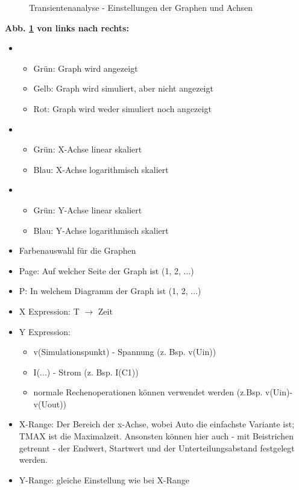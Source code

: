 \begin{figure}[h]
    \centering
    \caption{Transientenanalyse - Einstellungen der Graphen und Achsen}
    \label{fig:Transientenanalyse - Einstellungen der Graphen und Achsen}
\end{figure}

\textbf{Abb. \ref{fig:Transientenanalyse - Einstellungen der Graphen und Achsen} von links nach rechts:}
\begin{itemize}
    \item \begin{itemize}
        \item Grün: Graph wird angezeigt
        \item Gelb: Graph wird simuliert, aber nicht angezeigt
        \item Rot: Graph wird weder simuliert noch angezeigt
    \end{itemize}
    \item \begin{itemize}
        \item Grün: X-Achse linear skaliert
        \item Blau: X-Achse logarithmisch skaliert
    \end{itemize}
    \item \begin{itemize}
        \item Grün: Y-Achse linear skaliert
        \item Blau: Y-Achse logarithmisch skaliert
    \end{itemize}
    \item Farbenauswahl für die Graphen
    \item Page: Auf welcher Seite der Graph ist (1, 2, ...)
    \item P: In welchem Diagramm der Graph ist (1, 2, ...)
    \item X Expression: T $\rightarrow$ Zeit
    \item Y Expression: \begin{itemize}
        \item v(Simulationspunkt) - Spannung (z. Bsp. v(Uin))
        \item I(...) - Strom (z. Bsp. I(C1))
        \item normale Rechenoperationen können verwendet werden (z.Bsp. v(Uin)-v(Uout))
    \end{itemize}
    \item X-Range: Der Bereich der x-Achse, wobei Auto die einfachste Variante ist; TMAX ist die Maximalzeit. Ansonsten können hier auch - mit Beistrichen getrennt - der Endwert, Startwert und der Unterteilungsabstand festgelegt werden.
    \item Y-Range: gleiche Einstellung wie bei X-Range
\end{itemize}


